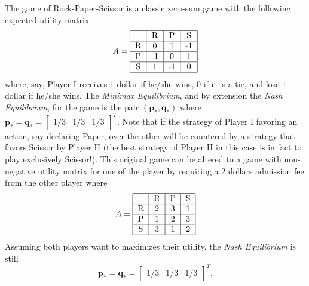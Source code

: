 \documentclass[journal, 11pt, a4paper, twoside]{IEEEtran}
\begin{document}
\begin{example} The game of Rock-Paper-Scissor is a classic zero-sum game with the following expected utility matrix
 $$A = \begin{tabular}{|c|c|c|c|}
    \hline  & R & P & S \\
    \hline R  & 0 & 1 & -1 \\
    \hline P & -1 & 0 & 1 \\
    \hline S & 1 & -1 & 0 \\
    \hline
    \end{tabular}$$
    where, say, Player I receives $1$ dollar if he/she wins, $0$ if it is a tie, and lose $1$ dollar if he/she wins. The \textit{Minimax Equilibrium}, and by extension the \textit{Nash Equilibrium}, for the game is the pair $(\bm{p}_*, \bm{q}_*)$ where $\bm{p}_* = \bm{q}_* = \begin{bmatrix}
        1/3 & 1/3 & 1/3
    \end{bmatrix}^T$. Note that if the strategy of Player I favoring an action, say declaring Paper, over the other will be countered by a strategy that favors Scissor by Player II (the best strategy of Player II in this case is in fact to play exclusively Scissor!). This original game can be altered to a game with non-negative utility matrix for one of the player by requiring a $2$ dollars admission fee from the other player where 
     $$A = \begin{tabular}{|c|c|c|c|}
    \hline  & R & P & S \\
    \hline R  & 2 & 3 & 1 \\
    \hline P & 1 & 2 & 3 \\
    \hline S & 3 & 1 & 2 \\
    \hline
    \end{tabular}$$
    Assuming both players want to maximizes their utility, the \textit{Nash Equilibrium} is still \[\bm{p}_* = \bm{q}_* = \begin{bmatrix}
        1/3 & 1/3 & 1/3
    \end{bmatrix}^T.\]
\end{example}
\end{document}
